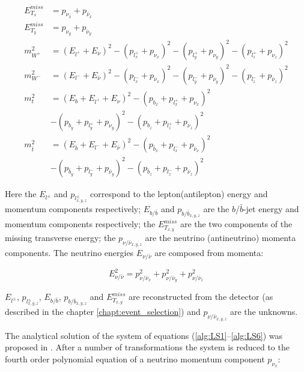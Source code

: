 \begin{align}\label{alg:LS1}
 E^{miss}_{T_{x}} & =  p_{\nu_{x}} + p_{\bar{\nu}_{x}} \\
 E^{miss}_{T_{y}} & =  p_{\nu_{y}} + p_{\bar{\nu}_{y}} \\
 m^{2}_{W^{+}} & = (E_{l^{+}} + E_{\nu})^{2} - (p_{l^{+}_{x}} + p_{\nu_{x}})^{2} - (p_{l^{+}_{y}} + p_{\nu_{y}})^{2} - (p_{l^{+}_{z}} + p_{\nu_{z}})^2 \\
 m^{2}_{W^{-}} & = (E_{l^{-}} + E_{\bar{\nu}})^{2} - (p_{l^{-}_{x}} + p_{\bar{\nu}_{x}})^{2} - (p_{l^{-}_{y}} + p_{\bar{\nu}_{y}})^{2} - (p_{l^{-}_{z}} + p_{\bar{\nu}_{z}})^2 \\
 m_{t}^{2} & = (E_{b} + E_{l^{+}} + E_{\nu})^{2} - (p_{b_{x}} + p_{l^{+}_{x}} + p_{\nu_{x}})^2 \nonumber \\
           & - (p_{b_{y}} + p_{l^{+}_{y}} + p_{\nu_{y}})^2 - (p_{b_{z}} + p_{l^{+}_{z}} + p_{\nu_{z}})^2 \\
 m_{\bar{t}}^{2} & = (E_{\bar{b}} + E_{l^{-}} + E_{\bar{\nu}})^{2} - (p_{\bar{b}_{x}} + p_{l^{-}_{x}} + p_{\bar{\nu}_{x}})^2 \nonumber \\
                 & - (p_{\bar{b}_{y}} + p_{l^{-}_{y}} + p_{\bar{\nu}_{y}})^2 - (p_{\bar{b}_{z}} + p_{l^{-}_{z}} + p_{\bar{\nu}_{z}})^2\label{alg:LS6} 
\end{align}

Here the $E_{l^{\pm}}$ and $p_{l^{\pm}_{x,y,z}}$ correspond to the lepton(antilepton) energy and momentum components respectively; 
$E_{b/\bar{b}}$ and $p_{b/\bar{b}_{x,y,z}}$ are the $b$/$\bar{b}$-jet energy and momentum components respectively; the $E^{miss}_{T_{x,y}}$ are
the two components of the missing transverse energy; the $p_{\nu/\bar{\nu}_{x,y,z}}$ are the neutrino (antineutrino) momenta components.
The neutrino energies $ E_{\nu/\bar{\nu}}$ are composed from momenta:

\begin{equation}
 E_{\nu/\bar{\nu}}^{2} = p_{\nu/\bar{\nu}_{x}}^{2} + p_{\nu/\bar{\nu}_{y}}^{2} + p_{\nu/\bar{\nu}_{z}}^{2}
\end{equation}

$E_{l^{\pm}}$, $p_{l^{\pm}_{x,y,z}}$, $E_{b/\bar{b}}$, $p_{b/\bar{b}_{x,y,z}}$ and $E^{miss}_{T_{x,y}}$ are reconstructed from the detector (as described in the chapter \ref{chapt:event_selection})
and $p_{\nu/\bar{\nu}_{x,y,z}}$ are the unknowns.

The analytical solution of the system of equations (\ref{alg:LS1}--\ref{alg:LS6}) was proposed in \cite{LSpaper}. After a number of transformations
the system is reduced to the fourth order polynomial equation of a neutrino momentum component $p_{\nu_{x}}$:

